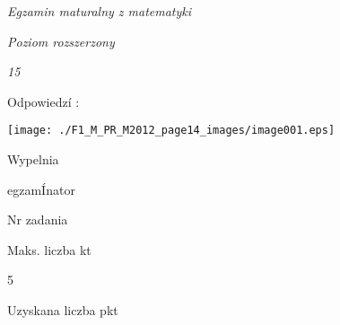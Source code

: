 \documentclass[a4paper,12pt]{article}
\begin{document}
{\it Egzamin maturalny z matematyki}

{\it Poziom rozszerzony}

{\it 15}

Odpowiedzí :
\begin{center}
\texttt{[image: ./F1\_M\_PR\_M2012\_page14\_images/image001.eps]}
\end{center}
Wypelnia

egzamÍnator

Nr zadania

Maks. liczba kt

5

Uzyskana liczba pkt
\end{document}

